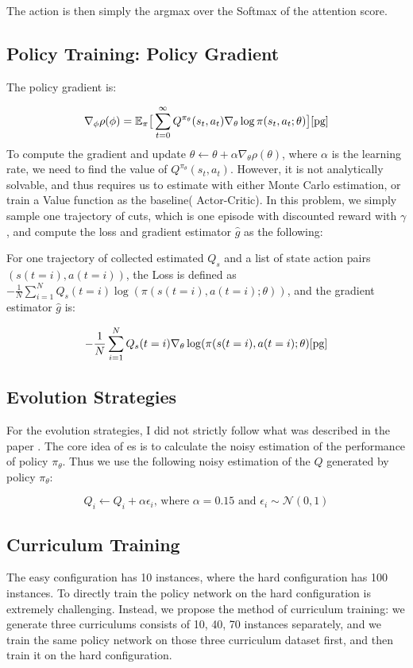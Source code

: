 \documentclass{article}
\begin{document}
 The action is then simply the argmax over the Softmax of the attention score.

\subsection{Policy Training: Policy Gradient}

The policy gradient is: 

$$\nabla_\phi \rho(\phi) = \mathbb{E}_{\pi} \big[\sum_{t=0}^\infty Q^{\pi_\theta}(s_t,a_t) \nabla_\theta \log \pi(s_t, a_t ; \theta) \big]\cite{pg}$$
To compute the gradient and update $\theta \leftarrow \theta + \alpha \nabla_\theta \rho(\theta)$, where $\alpha$ is the learning rate, we need to find the value of
 $Q^{\pi_\theta}(s_t,a_t)$. However, it is not analytically solvable, and thus requires us to estimate with either Monte Carlo estimation, or train a Value function as the baseline( Actor-Critic). In this problem, we simply sample one trajectory of cuts, which is one episode with discounted reward with $\gamma$, and compute the loss and gradient estimator $\hat g$ as the following: 

For one trajectory of collected estimated $Q_s$ and a list of state action pairs $(s(t = i), a(t = i))$, the Loss is defined as $-\frac{1}{N} \sum_{i=1}^N Q_s(t = i) \log(\pi(s(t = i), a(t = i) ; \theta)) $, and the gradient estimator $\hat g$ is:

$$- \frac{1}{N} \sum_{i=1}^N Q_s(t = i)  \nabla_\theta \log(\pi(s(t = i), a(t = i) ; \theta)\cite{pg} $$

\subsection{Evolution Strategies}
For the evolution strategies, I did not strictly follow what was described in the paper \cite{rlcut}. The core idea of es is to calculate the noisy estimation of the performance of policy $\pi_\theta$. Thus we use the following noisy estimation of the $Q$ generated by policy $\pi_\theta$:

$$Q_i \leftarrow Q_i + \alpha \epsilon_i \text{, where } \alpha = 0.15 \text{ and } \epsilon_i \sim \mathcal{N}(0,1)$$

\subsection{Curriculum Training}

The easy configuration has 10 instances, where the hard configuration has 100 instances. To directly train the policy network on the hard configuration is extremely challenging. Instead, we propose the method of curriculum training: we generate three curriculums consists of 10, 40, 70 instances separately, and we train the same policy network on those three curriculum dataset first, and then train it on the hard configuration.
\end{document}
